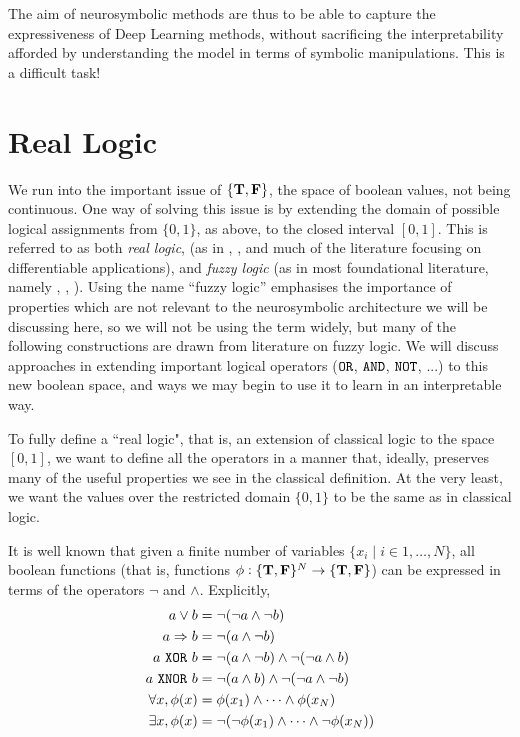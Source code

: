 The aim of neurosymbolic methods are thus to be able to capture the expressiveness of Deep Learning methods, without sacrificing the interpretability afforded by understanding the model in terms of symbolic manipulations. This is a difficult task! 

\section{Real Logic}

We run into the important issue of $\{\textbf{T}, \textbf{F}\}$, the space of boolean values, not being continuous. One way of solving this issue is by extending the domain of possible logical assignments from $\{0,1\}$, as above, to the closed interval $[0,1]$. This is referred to as both \textit{real logic}, (as in \cite{ltn2016}, \cite{analyzefuzzy}, and much of the literature focusing on differentiable applications), and \textit{fuzzy logic} (as in most foundational literature, namely \cite{fuzzysetbook}, \cite{fuzzylogicbook}, \cite{fuzzymetabook}). Using the name ``fuzzy logic'' emphasises the importance of properties which are not relevant to the neurosymbolic architecture we will be discussing here, so we will not be using the term widely, but many of the following constructions are drawn from literature on fuzzy logic. We will discuss approaches in extending important logical operators ($\texttt{OR}$, $\texttt{AND}$, $\texttt{NOT}$, ...) to this new boolean space, and ways we may begin to use it to learn in an interpretable way. 

To fully define a ``real logic", that is, an extension of classical logic to the space $[0,1]$, we want to define all the operators in a manner that, ideally, preserves many of the useful properties we see in the classical definition. At the very least, we want the values over the restricted domain $\{0,1\}$ to be the same as in classical logic.

It is well known that given a finite number of variables $\{x_i\mid i \in 1 , \dots, N \}$, all boolean functions (that is, functions $\phi : \{\textbf{T},\textbf{F}\}^N \rightarrow \{\textbf{T},\textbf{F}\}$) can be expressed in terms of the operators $\lnot$ and $\land$. Explicitly,
$$
\begin{aligned}
    a \lor b &= \lnot (\lnot a \land \lnot b) \\
    a \Rightarrow b &= \lnot (a \land \lnot b) \\
    a \ \texttt{XOR}\  b &= \lnot(a \land \lnot b) \land \lnot(\lnot a \land b) \\
    a \ \texttt{XNOR}\  b &= \lnot(a \land b) \land \lnot(\lnot a \land \lnot b) \\
    \forall x, \phi(x) &= \phi(x_1) \land \dots \land \phi(x_N) \\
    \exists x, \phi(x) &= \lnot(\lnot \phi(x_1) \land \dots \land \lnot \phi(x_N)) \\ 
\end{aligned}
$$

